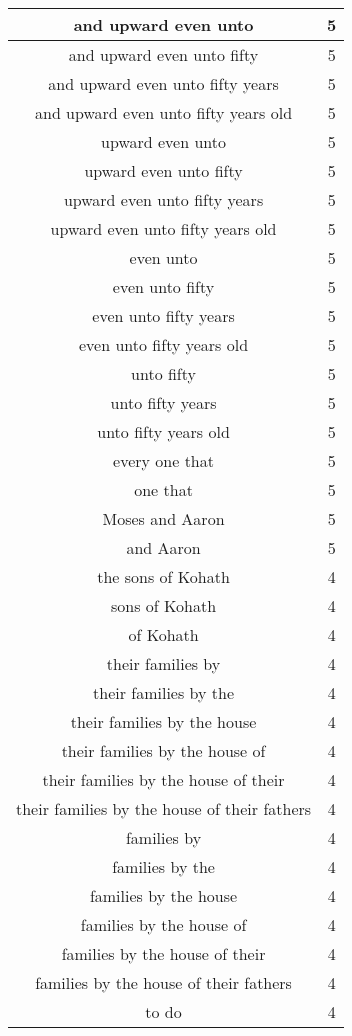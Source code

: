 \begin{center}
\begin{longtable}{|c|c|}
and upward even unto & 5\\ \hline 
and upward even unto fifty & 5\\ \hline 
and upward even unto fifty years & 5\\ \hline 
and upward even unto fifty years old & 5\\ \hline 
upward even unto & 5\\ \hline 
upward even unto fifty & 5\\ \hline 
upward even unto fifty years & 5\\ \hline 
upward even unto fifty years old & 5\\ \hline 
even unto & 5\\ \hline 
even unto fifty & 5\\ \hline 
even unto fifty years & 5\\ \hline 
even unto fifty years old & 5\\ \hline 
unto fifty & 5\\ \hline 
unto fifty years & 5\\ \hline 
unto fifty years old & 5\\ \hline 
every one that & 5\\ \hline 
one that & 5\\ \hline 
Moses and Aaron & 5\\ \hline 
and Aaron & 5\\ \hline 
the sons of Kohath & 4\\ \hline 
sons of Kohath & 4\\ \hline 
of Kohath & 4\\ \hline 
their families by & 4\\ \hline 
their families by the & 4\\ \hline 
their families by the house & 4\\ \hline 
their families by the house of & 4\\ \hline 
their families by the house of their & 4\\ \hline 
their families by the house of their fathers & 4\\ \hline 
families by & 4\\ \hline 
families by the & 4\\ \hline 
families by the house & 4\\ \hline 
families by the house of & 4\\ \hline 
families by the house of their & 4\\ \hline 
families by the house of their fathers & 4\\ \hline 
to do & 4\\ \hline 

\end{longtable}
\end{center}
